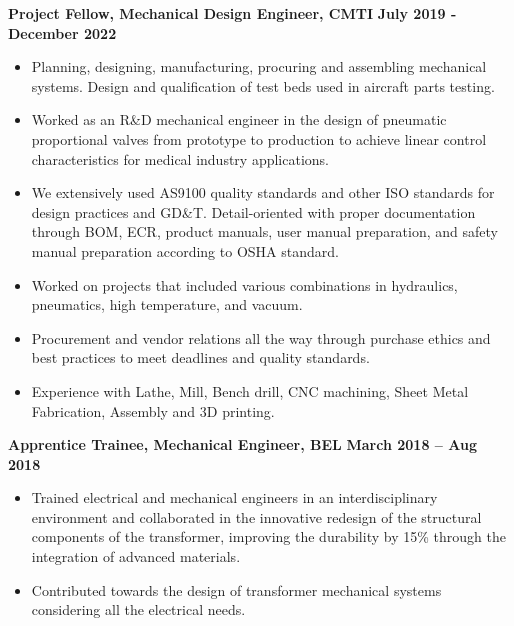 \documentclass[10pt, letterpaper]{article}
\begin{document}
\textbf{Project Fellow, Mechanical Design Engineer, CMTI} \hfill \textbf{July 2019 - December 2022}\\
\begin{itemize}
    \item Planning, designing, manufacturing, procuring and assembling mechanical systems. 
Design and qualification of test beds used in aircraft parts testing.
\item Worked as an R\&D mechanical engineer in the design of pneumatic proportional valves from prototype to production to achieve linear control characteristics for medical industry applications.
\item We extensively used AS9100 quality standards and other ISO standards for design practices and GD\&T.
Detail-oriented with proper documentation through BOM, ECR, product manuals, user manual preparation, and safety manual preparation according to OSHA standard.
\item Worked on projects that included various combinations in hydraulics, pneumatics, high temperature, and vacuum.  
\item Procurement and vendor relations all the way through purchase ethics and best practices to meet deadlines and quality standards.
\item Experience with Lathe, Mill, Bench drill, CNC machining, Sheet Metal Fabrication, Assembly  and 3D printing. 
\end{itemize}

\textbf{Apprentice Trainee, Mechanical Engineer, BEL} \hfill \textbf{March 2018 – Aug 2018}\\
\begin{itemize}
    \item Trained electrical and mechanical engineers in an interdisciplinary environment and collaborated in the innovative redesign of the structural components of the transformer, improving the durability by 15\% through the integration of advanced materials.
    \item Contributed towards the design of transformer mechanical systems considering all the electrical needs.
\end{itemize}

\end{document}
